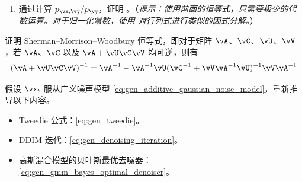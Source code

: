 \documentclass[../../book-main_zh.tex]{subfiles}
\begin{document}
\begin{exercise}
\begin{enumerate}
\begin{align}
            \end{align}
            其中 $\vm = \vmu_{\vx} +
                \vSigma_{\vx\vy}\vSigma_{\vy}^{-1}(\vy
                - \vmu_{\vy})$。
            \item 通过计算 $p_{\vx, \vy} / p_{\vy}$，证明 。（\textit{提示：使用前面的恒等式，只需要极少的代数运算。对于归一化常数，使用  对行列式进行类似的因式分解。}）

        \end{enumerate}

    \end{exercise}

    \begin{exercise}\label{exercise:sherman_morrison_woodbury_identity}
        证明 Sherman--Morrison--Woodbury 恒等式，即对于矩阵 \(\vA\)、\(\vC\)、\(\vU\)、\(\vV\)，若 \(\vA\)、\(\vC\) 以及 \(\vA + \vU\vC\vV\) 均可逆，则有
        \begin{equation}
            (\vA + \vU\vC\vV)^{-1} = \vA^{-1} - \vA^{-1}\vU(\vC^{-1} +
            \vV\vA^{-1}\vU)^{-1}\vV\vA^{-1}
        \end{equation}
    \end{exercise}

    \begin{exercise}\label{exercise:generalizing_results_to_different_noise_models}
        假设 \(\vx_{t}\) 服从广义噪声模型 \eqref{eq:gen_additive_gaussian_noise_model}，重新推导以下内容。
        \begin{itemize}
            \item Tweedie 公式：\eqref{eq:gen_tweedie}。
            \item DDIM 迭代：\eqref{eq:gen_denoising_iteration}。
            \item 高斯混合模型的贝叶斯最优去噪器：\eqref{eq:gen_gmm_bayes_optimal_denoiser}。
        \end{itemize}
    \end{exercise}
\end{document}
